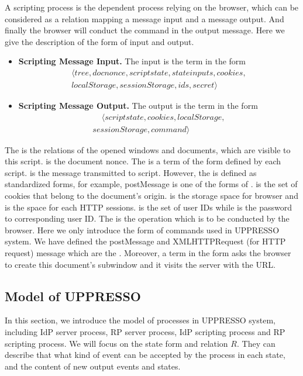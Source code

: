 A scripting process is the dependent process relying on the browser, which can be considered as a relation  mapping a message input and a message output. And finally the browser will conduct the command in the output message. Here we give the description of the form of input and output.
\begin{itemize}
\setlength\itemsep{-2pt}
\item \textbf{Scripting Message Input. } The input is the term in the form
\begin{multline*}
\langle tree, docnonce, scriptstate, stateinputs,cookies,\\
localStorage, sessionStorage, ids, secret \rangle
\end{multline*}
\item \textbf{Scripting Message Output. }The output is the term in the form
\begin{multline*}
\ \ \ \ \ \langle scriptstate, cookies, localStorage, \\
sessionStorage, command \rangle \ \ \ \ \ 
\end{multline*}
\end{itemize}
The  is the relations of the opened windows and documents, which are visible to this script.  is the document nonce. The   is a term of the form defined by each script.  is the message transmitted to script. However, the  is defined as standardized forms, for example, postMessage is one of the forms of .  is the set of cookies that belong to the document's origin.  is the storage space for browser and  is the space for each HTTP sessions.   is the set of user IDs while  is the password to corresponding user ID. The  is the operation which is to be conducted by the browser. Here we only introduce the form of commands used in UPPRESSO system. We have defined the postMessage and XMLHTTPRequest (for HTTP request) message which are the . Moreover, a term in the form  asks the browser to create this document's subwindow and it visits the server with the URL.



\subsection{Model of UPPRESSO}
In this section, we introduce the model of processes in UPPRESSO system, including IdP server process, RP server process, IdP scripting process and RP scripting process. We will focus on the state form and relation $R$. They can describe that what kind of event can be accepted by the process in each state, and the content of new output events and states.
